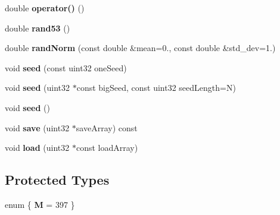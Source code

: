\begin{DoxyCompactItemize}
\item 
\hypertarget{classMTRand_abbb87a08d622d58fdee0eea4cb5471a0}{}double {\bfseries operator()} ()\label{classMTRand_abbb87a08d622d58fdee0eea4cb5471a0}

\item 
\hypertarget{classMTRand_a15f4daf79febbe4ff43c3e6ce2c4fcbe}{}double {\bfseries rand53} ()\label{classMTRand_a15f4daf79febbe4ff43c3e6ce2c4fcbe}

\item 
\hypertarget{classMTRand_a410775bb18f32161932b11f61f0fbd2c}{}double {\bfseries rand\+Norm} (const double \&mean=0., const double \&std\+\_\+dev=1.)\label{classMTRand_a410775bb18f32161932b11f61f0fbd2c}

\item 
\hypertarget{classMTRand_a1e21a79e0a30225fffe924229e34a923}{}void {\bfseries seed} (const uint32 one\+Seed)\label{classMTRand_a1e21a79e0a30225fffe924229e34a923}

\item 
\hypertarget{classMTRand_a5758103776b131e8ea46b6dc1b9fb267}{}void {\bfseries seed} (uint32 $\ast$const big\+Seed, const uint32 seed\+Length=N)\label{classMTRand_a5758103776b131e8ea46b6dc1b9fb267}

\item 
\hypertarget{classMTRand_ad88ea3363d55bafb62826bbd130279c2}{}void {\bfseries seed} ()\label{classMTRand_ad88ea3363d55bafb62826bbd130279c2}

\item 
\hypertarget{classMTRand_ad60e0f3f5c90baab75b74f9a2ccae871}{}void {\bfseries save} (uint32 $\ast$save\+Array) const \label{classMTRand_ad60e0f3f5c90baab75b74f9a2ccae871}

\item 
\hypertarget{classMTRand_a8302e9a8cd16d8dfc536a85bf2f68be0}{}void {\bfseries load} (uint32 $\ast$const load\+Array)\label{classMTRand_a8302e9a8cd16d8dfc536a85bf2f68be0}

\end{DoxyCompactItemize}
\subsection*{Protected Types}
\begin{DoxyCompactItemize}
\item 
\hypertarget{classMTRand_a10c3437be98225f5b0beee1ed8c033c8}{}enum \{ {\bfseries M} = 397
 \}\label{classMTRand_a10c3437be98225f5b0beee1ed8c033c8}

\end{DoxyCompactItemize}
